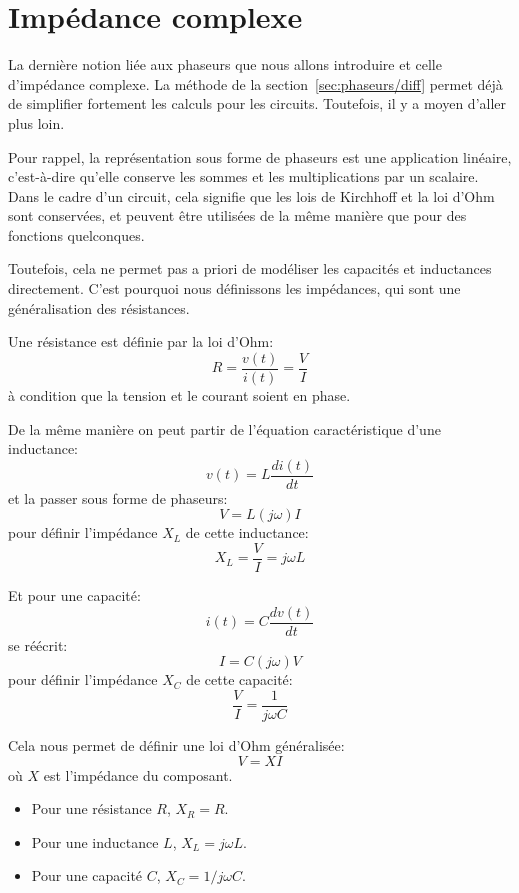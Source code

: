 \section{Impédance complexe}

La dernière notion liée aux phaseurs que nous allons introduire
et celle d'impédance complexe.
La méthode de la section~\ref{sec:phaseurs/diff} permet déjà
de simplifier fortement les calculs pour les circuits.
Toutefois, il y a moyen d'aller plus loin.

Pour rappel, la représentation sous forme de phaseurs est une application
linéaire,
c'est-à-dire qu'elle conserve les sommes et les multiplications par un scalaire.
Dans le cadre d'un circuit, cela signifie
que les lois de Kirchhoff et la loi d'Ohm sont conservées,
et peuvent être utilisées de la même manière que pour des fonctions
quelconques.

Toutefois, cela ne permet pas a priori de modéliser les capacités
et inductances directement.
C'est pourquoi nous définissons les impédances, qui sont une généralisation
des résistances.

Une résistance est définie par la loi d'Ohm:
\begin{equation}
    R = \frac{v(t)}{i(t)} = \frac{V}{I}
\end{equation}
à condition que la tension et le courant soient en phase.

De la même manière on peut partir de l'équation caractéristique
d'une inductance:
\begin{equation}
    v(t) = L\frac{di(t)}{dt}
\end{equation}
et la passer sous forme de phaseurs:
\begin{equation}
    V = L (j\omega) I
\end{equation}
pour définir l'impédance $X_L$ de cette inductance:
\begin{equation}
    X_L = \frac{V}{I} = j\omega L
\end{equation}

Et pour une capacité:
\begin{equation}
    i(t) = C\frac{dv(t)}{dt}
\end{equation}
se réécrit:
\begin{equation}
    I = C (j\omega) V
\end{equation}
pour définir l'impédance $X_C$ de cette capacité:
\begin{equation}
    \frac{V}{I} = \frac{1}{j\omega C}
\end{equation}

Cela nous permet de définir une loi d'Ohm généralisée:
\begin{equation}
    V = XI
\end{equation}
où $X$ est l'impédance du composant.
\begin{itemize}
    \item Pour une résistance $R$, $X_R=R$.
    \item Pour une inductance $L$, $X_L=j\omega L$.
    \item Pour une capacité $C$, $X_C=1/j\omega C$.
\end{itemize}
